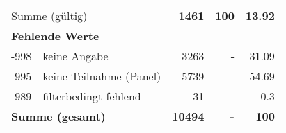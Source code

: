\begin{longtable}{lXrrr}
     \midrule
     \multicolumn{2}{l}{Summe (gültig)} &
       \textbf{\num{1461}} &
     \textbf{\num{100}} &
       \textbf{\num[round-mode=places,round-precision=2]{13.92}} \\
     \multicolumn{5}{l}{\textbf{Fehlende Werte}}\\
       -998 &
       keine Angabe &
         \num{3263} &
        - &
         \num[round-mode=places,round-precision=2]{31.09} \\
       -995 &
       keine Teilnahme (Panel) &
         \num{5739} &
        - &
         \num[round-mode=places,round-precision=2]{54.69} \\
       -989 &
       filterbedingt fehlend &
         \num{31} &
        - &
         \num[round-mode=places,round-precision=2]{0.3} \\
     \midrule
     \multicolumn{2}{l}{\textbf{Summe (gesamt)}} &
          \textbf{\num{10494}} &
        \textbf{-} &
        \textbf{\num{100}} \\
     \bottomrule
     \end{longtable}
     
